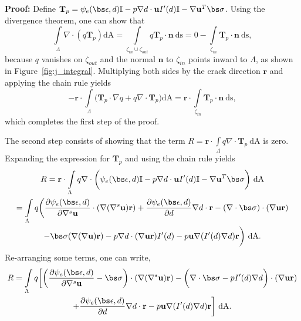 \medskip

\noindent \textbf{Proof:} Define $\textbf{T}_p = \psi_e(\bs\epsilon, d)\mathbb{I} -p\nabla d\cdot\textbf{u}I'(d)\mathbb{I}  - \nabla \textbf{u}^T\bs \sigma$. Using the divergence theorem, one can show that
\begin{equation}
    \int\limits_{\Lambda} \nabla\cdot(q\textbf{T}_p)\text{dA} = \int\limits_{\zeta_{in}\cup\zeta_{out}}q\textbf{T}_p\cdot\textbf{n}\ \text{ds} = 0 - \int\limits_{\zeta_{in}}\textbf{T}_p\cdot\textbf{n}\ \text{ds}, 
\end{equation}
because $q$ vanishes on $\zeta_{out}$ and the normal $\textbf{n}$ to $\zeta_{in}$ points inward to $\Lambda$, as shown in Figure~\ref{fig:j_integral}.  
Multiplying both sides by the crack direction $\textbf{r}$ and applying the chain rule yields
\begin{equation}\label{first_step}
    -\textbf{r}\cdot\int\limits_{\Lambda} \biggl( \textbf{T}_p\cdot \nabla q + q\nabla \cdot \textbf{T}_p\biggr)\text{dA} =  \textbf{r}\cdot\int\limits_{\zeta_{in}}\textbf{T}_p\cdot\textbf{n}\ \text{ds}, 
\end{equation}
 which completes the first step of the proof. 
 
 The second step consists of showing that the term $R = \textbf{r}\cdot\int\limits_{\Lambda} q\nabla \cdot \textbf{T}_p\ \text{dA}$ is zero. Expanding the expression for $\textbf{T}_p$ and using the chain rule yields
\begin{multline}
    R = \textbf{r}\cdot\int\limits_{\Lambda} q\nabla \cdot \biggl( \psi_e(\bs\epsilon, d)\mathbb{I} -p\nabla d\cdot\textbf{u}I'(d)\mathbb{I}  - \nabla \textbf{u}^T\bs\sigma \biggr)\ \text{dA} \\ = \int\limits_{\Lambda} q\biggl( \dfrac{\partial \psi_e(\bs\epsilon, d)}{\partial\nabla^s\textbf{u}}\cdot(\nabla(\nabla^s\textbf{u})\textbf{r}) + \dfrac{\partial \psi_e(\bs\epsilon, d)}{\partial d}\nabla d\cdot \textbf{r}
    - (\nabla \cdot \bs\sigma)\cdot(\nabla\textbf{u}\textbf{r}) \\ - \bs\sigma(\nabla (\nabla\textbf{u})\textbf{r})-p\nabla d\cdot(\nabla \textbf{u}\textbf{r})I'(d) - p\textbf{u}\nabla(I'(d)\nabla d)\textbf{r} \biggr)\ \text{dA}.
\end{multline}
 Re-arranging some terms, one can write,
\begin{multline}
    R = \int\limits_{\Lambda} q\biggl[\biggl( \dfrac{\partial \psi_e(\bs\epsilon, d)}{\partial\nabla^s\textbf{u}}-\bs\sigma\biggr) \cdot(\nabla(\nabla^s\textbf{u})\textbf{r}) 
    -\biggl( \nabla \cdot \bs\sigma - pI'(d) \nabla d \biggr)\cdot (\nabla\textbf{u}\textbf{r})
    \\ + \dfrac{\partial \psi_e(\bs\epsilon, d)}{\partial d}\nabla d\cdot \textbf{r}
    - p\textbf{u}\nabla(I'(d)\nabla d)\textbf{r} \biggr]\ \text{dA}.
\end{multline}

